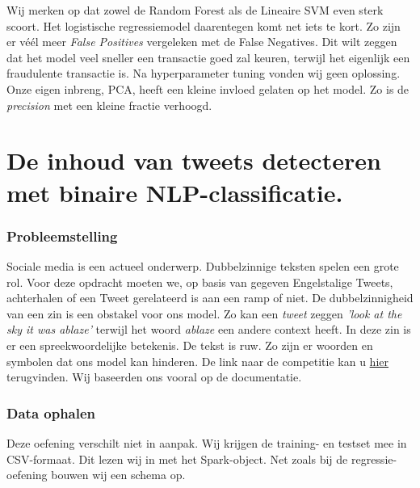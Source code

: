 \documentclass[a4paper,10pt,twoside]{report}
\begin{document}
Wij merken op dat zowel de Random Forest als de Lineaire SVM even sterk scoort. Het logistische regressiemodel daarentegen komt net iets te kort. Zo zijn er véél meer \textit{False Positives} vergeleken met de {False Negatives}. Dit wilt zeggen dat het model veel sneller een transactie goed zal keuren, terwijl het eigenlijk een fraudulente transactie is. Na hyperparameter tuning vonden wij geen oplossing. Onze eigen inbreng, PCA, heeft een kleine invloed gelaten op het model. Zo is de \textit{precision} met een kleine fractie verhoogd. 

\chapter{De inhoud van tweets detecteren met binaire NLP-classificatie.}

\subsection*{Probleemstelling}

Sociale media is een actueel onderwerp. Dubbelzinnige teksten spelen een grote rol. Voor deze opdracht moeten we, op basis van gegeven Engelstalige Tweets, achterhalen of een Tweet gerelateerd is aan een ramp of niet. De dubbelzinnigheid van een zin is een obstakel voor ons model. Zo kan een \textit{tweet} zeggen \textit{'look at the sky it was ablaze'} terwijl het woord \textit{ablaze} een andere context heeft. In deze zin is er een spreekwoordelijke betekenis. De tekst is ruw. Zo zijn er woorden en symbolen dat ons model kan hinderen. De link naar de competitie kan u \href{https://www.kaggle.com/c/nlp-getting-started}{hier} terugvinden. Wij baseerden ons vooral op de documentatie.

\subsection*{Data ophalen}

Deze oefening verschilt niet in aanpak. Wij krijgen de training- en testset mee in CSV-formaat. Dit lezen wij in met het Spark-object. Net zoals bij de regressie-oefening bouwen wij een schema op.
\end{document}
